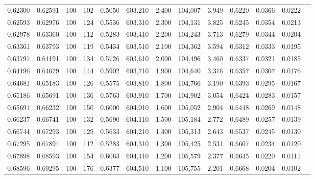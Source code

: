 \begin{tabular}{rrrrrrrrrrrrr}
0.62300 & 0.62591 &   100 & 102 &                                     0.5050 & 603,210 &   2,400 & 104,007 &   3,949 & 0.6220 & 0.0366 & 0.0222 \\
0.62593 & 0.62976 &   100 & 124 &                                     0.5536 & 603,310 &   2,300 & 104,131 &   3,825 & 0.6245 & 0.0354 & 0.0213 \\
0.62978 & 0.63360 &   100 & 112 &                                     0.5283 & 603,410 &   2,200 & 104,243 &   3,713 & 0.6279 & 0.0344 & 0.0204 \\
0.63361 & 0.63793 &   100 & 119 &                                     0.5434 & 603,510 &   2,100 & 104,362 &   3,594 & 0.6312 & 0.0333 & 0.0195 \\
0.63797 & 0.64191 &   100 & 134 &                                     0.5726 & 603,610 &   2,000 & 104,496 &   3,460 & 0.6337 & 0.0321 & 0.0185 \\
0.64196 & 0.64679 &   100 & 144 &                                     0.5902 & 603,710 &   1,900 & 104,640 &   3,316 & 0.6357 & 0.0307 & 0.0176 \\
0.64681 & 0.65183 &   100 & 126 &                                     0.5575 & 603,810 &   1,800 & 104,766 &   3,190 & 0.6393 & 0.0295 & 0.0167 \\
0.65186 & 0.65691 &   100 & 136 &                                     0.5763 & 603,910 &   1,700 & 104,902 &   3,054 & 0.6424 & 0.0283 & 0.0157 \\
0.65691 & 0.66232 &   100 & 150 &                                     0.6000 & 604,010 &   1,600 & 105,052 &   2,904 & 0.6448 & 0.0269 & 0.0148 \\
0.66237 & 0.66741 &   100 & 132 &                                     0.5690 & 604,110 &   1,500 & 105,184 &   2,772 & 0.6489 & 0.0257 & 0.0139 \\
0.66744 & 0.67293 &   100 & 129 &                                     0.5633 & 604,210 &   1,400 & 105,313 &   2,643 & 0.6537 & 0.0245 & 0.0130 \\
0.67295 & 0.67894 &   100 & 112 &                                     0.5283 & 604,310 &   1,300 & 105,425 &   2,531 & 0.6607 & 0.0234 & 0.0120 \\
0.67898 & 0.68593 &   100 & 154 &                                     0.6063 & 604,410 &   1,200 & 105,579 &   2,377 & 0.6645 & 0.0220 & 0.0111 \\
0.68596 & 0.69295 &   100 & 176 &                                     0.6377 & 604,510 &   1,100 & 105,755 &   2,201 & 0.6668 & 0.0204 & 0.0102 \\

\end{tabular}
